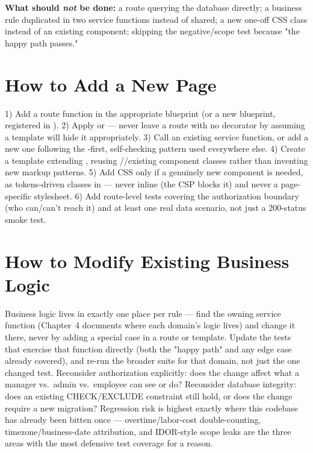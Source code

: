 \textbf{What should \emph{not} be done:} a route querying the database
directly; a business rule duplicated in two service functions instead
of shared; a new one-off CSS class instead of an existing component;
skipping the negative/scope test because "the happy path passes."

\section{How to Add a New Page}

1) Add a route function in the appropriate blueprint (or a new
blueprint, registered in ). 2) Apply
 or  --- never leave a
route with no decorator by assuming a template will hide it
appropriately. 3) Call an existing service function, or add a new one
following the -first, self-checking pattern used
everywhere else. 4) Create a template extending ,
reusing //existing component
classes rather than inventing new markup patterns. 5) Add CSS only if a
genuinely new component is needed, as tokens-driven classes in
 --- never inline  (the CSP
blocks it) and never a page-specific stylesheet. 6) Add route-level
tests covering the authorization boundary (who can/can't reach it) and
at least one real data scenario, not just a 200-status smoke test.

\section{How to Modify Existing Business Logic}

Business logic lives in exactly one place per rule --- find the owning
service function (Chapter~4 documents where each domain's logic lives)
and change it there, never by adding a special case in a route or
template. Update the tests that exercise that function directly (both
the "happy path" and any edge case already covered), and re-run the
broader suite for that domain, not just the one changed test.
Reconsider authorization explicitly: does the change affect what a
manager vs.\ admin vs.\ employee can see or do? Reconsider database
integrity: does an existing CHECK/EXCLUDE constraint still hold, or
does the change require a new migration? Regression risk is highest
exactly where this codebase has already been bitten once ---
overtime/labor-cost double-counting, timezone/business-date attribution,
and IDOR-style scope leaks are the three areas with the most defensive
test coverage for a reason.

